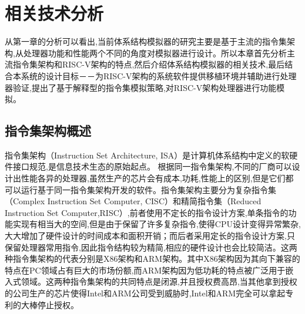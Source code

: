 
\chapter{相关技术分析}

从第一章的分析可以看出,当前体系结构模拟器的研究主要是基于主流的指令集架构,从处理器功能和性能两个不同的角度对模拟器进行设计。所以本章首先分析主流指令集架构和RISC-V架构的特点,然后介绍体系结构模拟器的相关技术,最后结合本系统的设计目标－－为RISC-V架构的系统软件提供移植环境并辅助进行处理器验证,提出了基于解释型的指令集模拟策略,对RISC-V架构处理器进行功能模拟。

\section{指令集架构概述}

指令集架构（Instruction Set Architecture, ISA）是计算机体系结构中定义的软硬件接口规范,是信息技术生态的原始起点\cite{刘畅2021risc}。
根据同一指令集架构,不同的厂商可以设计出性能各异的处理器,虽然生产的芯片会有成本,功耗,性能上的区别,但是它们都可以运行基于同一指令集架构开发的软件。指令集架构主要分为复杂指令集（Complex Instruction Set Computer, CISC）和精简指令集（Reduced Instruction Set Computer,RISC）,前者使用不定长的指令设计方案,单条指令的功能实现有相当大的空间,但是由于保留了许多复杂指令,使得CPU设计变得异常繁杂,大大增加了硬件设计的时间成本和面积开销\cite{王雅婕2020用于能量计量的}；而后者采用定长的指令设计方案,只保留处理器常用指令,因此指令结构较为精简,相应的硬件设计也会比较简洁。这两种指令集架构的代表分别是X86架构和ARM架构。其中X86架构因为其向下兼容的特点在PC领域占有巨大的市场份额,而ARM架构因为低功耗的特点被广泛用于嵌入式领域。这两种指令集架构的共同特点是闭源,并且授权费高昂,当其他拿到授权的公司生产的芯片使得Intel和ARM公司受到威胁时,Intel和ARM完全可以拿起专利的大棒停止授权\cite{huzhenbo}。



